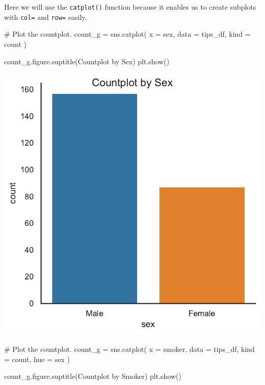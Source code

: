 \documentclass[
  letterpaper,
  DIV=11,
  numbers=noendperiod]{scrartcl}
\newenvironment{Shaded}{\begin{snugshade}}{\end{snugshade}}
\newcommand{\CommentTok}[1]{\textcolor[rgb]{0.37,0.37,0.37}{#1}}
\newcommand{\NormalTok}[1]{\textcolor[rgb]{0.00,0.46,0.62}{#1}}
\newcommand{\OperatorTok}[1]{\textcolor[rgb]{0.37,0.37,0.37}{#1}}
\newcommand{\StringTok}[1]{\textcolor[rgb]{0.13,0.47,0.30}{#1}}
\begin{document}
Here we will use the \texttt{catplot()} function because it enables us
to create subplots with \texttt{col=} and \texttt{row=} easily.

\begin{Shaded}
\begin{Highlighting}[]
\CommentTok{\# Plot the countplot.}
\NormalTok{count\_g }\OperatorTok{=}\NormalTok{ sns.catplot(}
\NormalTok{    x }\OperatorTok{=} \StringTok{\textquotesingle{}sex\textquotesingle{}}\NormalTok{,}
\NormalTok{    data }\OperatorTok{=}\NormalTok{ tips\_df,}
\NormalTok{    kind }\OperatorTok{=} \StringTok{\textquotesingle{}count\textquotesingle{}}
\NormalTok{)}

\NormalTok{count\_g.figure.suptitle(}\StringTok{\textquotesingle{}Countplot by Sex\textquotesingle{}}\NormalTok{)}
\NormalTok{plt.show()}
\end{Highlighting}
\end{Shaded}

\includegraphics{data_visualization_with_seaborn_files/figure-pdf/cell-13-output-1.pdf}

\begin{Shaded}
\begin{Highlighting}[]
\CommentTok{\# Plot the countplot.}
\NormalTok{count\_g }\OperatorTok{=}\NormalTok{ sns.catplot(}
\NormalTok{    x }\OperatorTok{=} \StringTok{\textquotesingle{}smoker\textquotesingle{}}\NormalTok{,}
\NormalTok{    data }\OperatorTok{=}\NormalTok{ tips\_df,}
\NormalTok{    kind }\OperatorTok{=} \StringTok{\textquotesingle{}count\textquotesingle{}}\NormalTok{,}
\NormalTok{    hue }\OperatorTok{=} \StringTok{\textquotesingle{}sex\textquotesingle{}}
\NormalTok{)}

\NormalTok{count\_g.figure.suptitle(}\StringTok{\textquotesingle{}Countplot by Smoker\textquotesingle{}}\NormalTok{)}
\NormalTok{plt.show()}
\end{Highlighting}
\end{Shaded}
\end{document}
